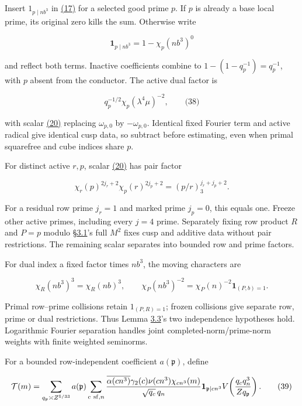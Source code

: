 Insert \(1_{p\mid nb^3}\) in \protect\hyperlink{cf:eq:B.1}{(17)} for a selected good prime \(p\). If \(p\) is already a base local prime, its original zero kills the sum. Otherwise write

\[
\mathbf1_{p\mid nb^3}=1-\chi_p(nb^3)^0
\]

and reflect both terms. Inactive coefficients combine to \(1-(1-q_p^{-1})=q_p^{-1}\), with \(p\) absent from the conductor. The active dual factor is

\hypertarget{cf:eq:B.21}{}

\label{cf:eq:B.21}

\[
q_p^{-1/2}\chi_p(\lambda^4\mu)^{-2},
\qquad\text{(38)}
\]

with scalar \protect\hyperlink{cf:eq:B.4}{(20)} replacing \(\omega_{p,0}\) by \(-\omega_{p,0}\). Identical fixed Fourier term and active radical give identical cusp data, so subtract before estimating, even when primal squarefree and cube indices share \(p\).

For distinct active \(r,p\), scalar \protect\hyperlink{cf:eq:B.4}{(20)} has pair factor

\[
\chi_r(p)^{2j_r+2}\chi_p(r)^{2j_p+2}
=(p/r)_3^{j_r+j_p+2}.
\]

For a residual row prime \(j_r=1\) and marked prime \(j_p=0\), this equals one. Freeze other active primes, including every \(j=4\) prime. Separately fixing row product \(R\) and \(P=p\) modulo §\protect\hyperlink{cf:sec:B.1}{3.1}'s full \(M^2\) fixes cusp and additive data without pair restrictions. The remaining scalar separates into bounded row and prime factors.

For dual index a fixed factor times \(nb^3\), the moving characters are

\[
\chi_R(nb^3)^3=\chi_R(nb)^3,\qquad
\chi_P(nb^3)^{-2}=\chi_P(n)^{-2}\mathbf1_{(P,b)=1}.
\]

Primal row--prime collisions retain \(1_{(P,R)=1}\); frozen collisions give separate row, prime or dual restrictions. Thus Lemma \protect\hyperlink{cf:hybrid-norm}{3.3}'s two independence hypotheses hold. Logarithmic Fourier separation handles joint completed-norm/prime-norm weights with finite weighted seminorms.

For a bounded row-independent coefficient \(a(\mathfrak p)\), define

\hypertarget{cf:eq:4.5}{}

\label{cf:eq:4.5}

\[
\mathcal T(m)=\sum_{q_{\mathfrak p}\asymp Z^{5/33}}a(\mathfrak p)
 \sum_{c\ {\rm sf},n}\frac{\overline{\alpha(cn^3)}\gamma_2(c)\nu(cn^3)\chi_{cn^3}(m)}
 {\sqrt{q_c}\,q_n}\mathbf1_{\mathfrak p\mid cn^3}
 V\!\left(\frac{q_cq_n^3}{Zq_{\mathfrak p}}\right).
\qquad\text{(39)}
\]

